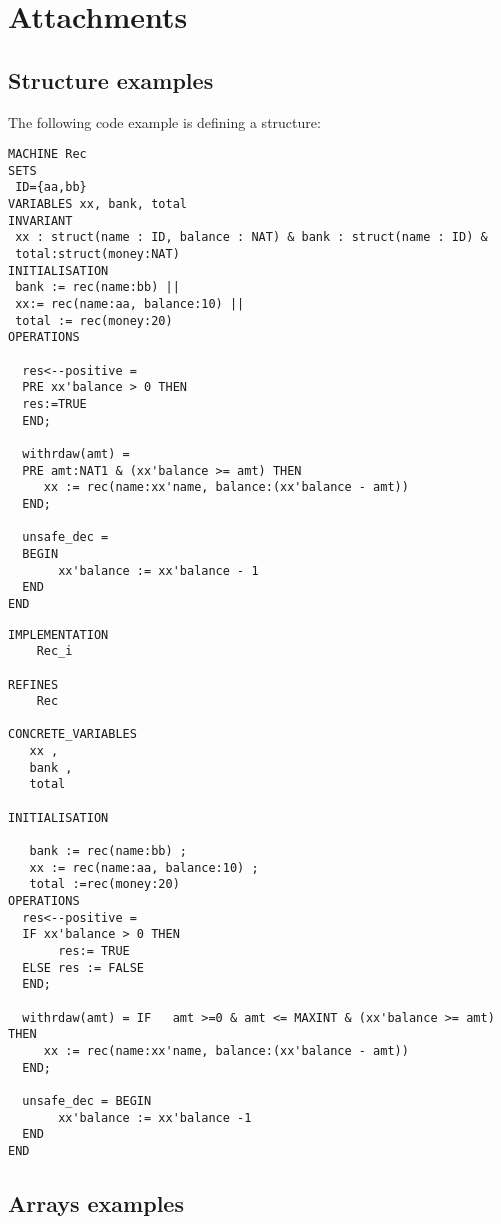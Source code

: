 \documentclass[10pt,a4paper]{article}
\begin{document}
\section*{Attachments}

\subsection{Structure examples}

The following code example is defining a structure:


\begin{verbatim}
MACHINE Rec
SETS
 ID={aa,bb}
VARIABLES xx, bank, total
INVARIANT
 xx : struct(name : ID, balance : NAT) & bank : struct(name : ID) &
 total:struct(money:NAT)
INITIALISATION 
 bank := rec(name:bb) ||
 xx:= rec(name:aa, balance:10) ||
 total := rec(money:20)
OPERATIONS

  res<--positive = 
  PRE xx'balance > 0 THEN
  res:=TRUE
  END;

  withrdaw(amt) = 
  PRE amt:NAT1 & (xx'balance >= amt) THEN
     xx := rec(name:xx'name, balance:(xx'balance - amt))
  END;
  
  unsafe_dec = 
  BEGIN
       xx'balance := xx'balance - 1
  END
END
\end{verbatim}


\begin{verbatim}
IMPLEMENTATION
    Rec_i

REFINES
    Rec

CONCRETE_VARIABLES
   xx ,
   bank ,
   total

INITIALISATION
   
   bank := rec(name:bb) ;
   xx := rec(name:aa, balance:10) ;
   total :=rec(money:20)
OPERATIONS
  res<--positive = 
  IF xx'balance > 0 THEN
       res:= TRUE 
  ELSE res := FALSE
  END;

  withrdaw(amt) = IF   amt >=0 & amt <= MAXINT & (xx'balance >= amt) THEN 
     xx := rec(name:xx'name, balance:(xx'balance - amt))
  END;

  unsafe_dec = BEGIN
       xx'balance := xx'balance -1 
  END
END
\end{verbatim}




\subsection{Arrays examples}
\end{document}
